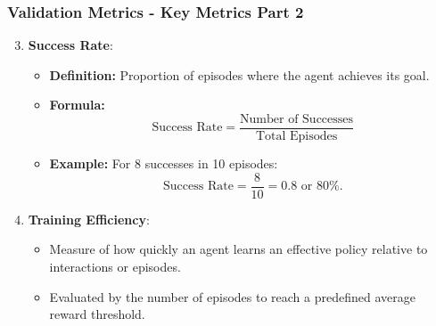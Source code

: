 \documentclass[aspectratio=169]{beamer}
\begin{document}
\begin{frame}[fragile]
    \frametitle{Validation Metrics - Key Metrics Part 2}
    \begin{enumerate}
        \setcounter{enumi}{2} %
        \item \textbf{Success Rate}:
        \begin{itemize}
            \item \textbf{Definition:} Proportion of episodes where the agent achieves its goal.
            \item \textbf{Formula:}
            \begin{equation}
                \text{Success Rate} = \frac{\text{Number of Successes}}{\text{Total Episodes}}
            \end{equation}
            \item \textbf{Example:} For 8 successes in 10 episodes:
            \begin{equation}
                \text{Success Rate} = \frac{8}{10} = 0.8 \text{ or } 80\%.
            \end{equation}
        \end{itemize}

        \item \textbf{Training Efficiency}:
        \begin{itemize}
            \item Measure of how quickly an agent learns an effective policy relative to interactions or episodes.
            \item Evaluated by the number of episodes to reach a predefined average reward threshold.
        \end{itemize}
    \end{enumerate}
\end{frame}
\end{document}
